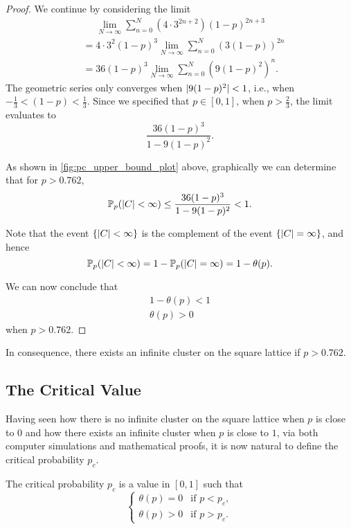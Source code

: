 \documentclass[a4paper, 12pt]{article}
\begin{document}
\begin{proof}
We continue by considering the limit
\begin{align*}
    &\phantom{=}\lim_{N \to \infty} \sum_{n = 0}^N (4 \cdot 3^{2n + 2}) (1 - p)^{2n + 3}\\
    &= 4 \cdot 3^2 (1 - p)^3 \lim_{N \to \infty} \sum_{n = 0}^N \left(3 (1 - p)\right)^{2n}\\
    &= 36 (1 - p)^3 \lim_{N \to \infty} \sum_{n = 0}^N \left(9 (1 - p)^2\right)^n.
\end{align*}
The geometric series only converges when $\lvert 9 (1 - p)^2 \rvert < 1$, i.e., when $-\frac{1}{3} < (1 - p) < \frac{1}{3}$. Since we specified that $p \in [0, 1]$, when $p > \frac{2}{3}$, the limit evaluates to
\[
    \frac{36 (1 - p)^3}{1 - 9 (1 - p)^2}.
\]



As shown in \cref{fig:pc_upper_bound_plot} above, graphically we can determine that for $p > 0.762$, \[\mathbb{P}_p(\lvert C \rvert < \infty) \leq \frac{36(1 - p)^3}{1 - 9(1 - p)^2} < 1.\]

Note that the event $\{\lvert C \rvert < \infty\}$ is the complement of the event $\{\lvert C \rvert = \infty\}$, and hence
\[
    \mathbb{P}_p(\lvert C \rvert < \infty) = 1 - \mathbb{P}_p(\lvert C \rvert = \infty) = 1 - \theta(p).
\]

We can now conclude that
\begin{align*}
    1 - \theta(p) < 1\\
    \theta(p) > 0
\end{align*}
when $p > 0.762$.
\end{proof}

In consequence, there exists an infinite cluster on the square lattice if $p > 0.762$.

\subsection{The Critical Value}\label{subsec:pc}
Having seen how there is no infinite cluster on the square lattice when $p$ is close to $0$ and how there exists an infinite cluster when $p$ is close to $1$, via both computer simulations and mathematical proofs, it is now natural to define the critical probability $p_c$.

\begin{defn}\label{defn:pc}
The critical probability $p_c$ is a value in $[0, 1]$ such that
\[
\begin{cases}
\theta(p) = 0 &\text{if } p < p_c,\\
\theta(p) > 0 &\text{if } p > p_c.
\end{cases}
\]
\end{defn}
\end{document}
